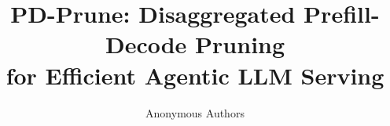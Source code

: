 \documentclass[11pt]{article}
\title{PD-Prune: Disaggregated Prefill-Decode Pruning\\
for Efficient Agentic LLM Serving}
\author{Anonymous Authors}
\begin{document}
\maketitle

\begin{abstract}

\end{abstract}










\appendix





\end{document}
